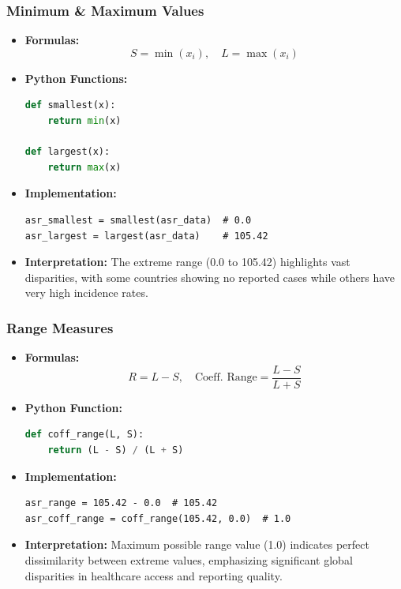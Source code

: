 \begin{frame}[fragile]
    \frametitle{Minimum \& Maximum Values}
    \begin{itemize}
        \item \textbf{Formulas:}
        \[
        S = \min(x_i),\quad L = \max(x_i)
        \]
        
        \item \textbf{Python Functions:}
        \begin{lstlisting}[language=Python, breaklines=true]
def smallest(x):
    return min(x)

def largest(x):
    return max(x)
        \end{lstlisting}
        
        \item \textbf{Implementation:}
        \begin{lstlisting}
asr_smallest = smallest(asr_data)  # 0.0
asr_largest = largest(asr_data)    # 105.42
        \end{lstlisting}
        
        \item \textbf{Interpretation:} The extreme range (\SI{0.0}{\perthousand} to \SI{105.42}{\perthousand}) highlights vast disparities, with some countries showing no reported cases while others have very high incidence rates.
    \end{itemize}
\end{frame}

\begin{frame}[fragile]
    \frametitle{Range Measures}
    \begin{itemize}
        \item \textbf{Formulas:}
        \[
        R = L - S,\quad \text{Coeff. Range} = \frac{L - S}{L + S}
        \]
        
        \item \textbf{Python Function:}
        \begin{lstlisting}[language=Python, breaklines=true]
def coff_range(L, S):
    return (L - S) / (L + S)
        \end{lstlisting}
        
        \item \textbf{Implementation:}
        \begin{lstlisting}
asr_range = 105.42 - 0.0  # 105.42
asr_coff_range = coff_range(105.42, 0.0)  # 1.0
        \end{lstlisting}
        
        \item \textbf{Interpretation:} Maximum possible range value (1.0) indicates perfect dissimilarity between extreme values, emphasizing significant global disparities in healthcare access and reporting quality.
    \end{itemize}
\end{frame}

